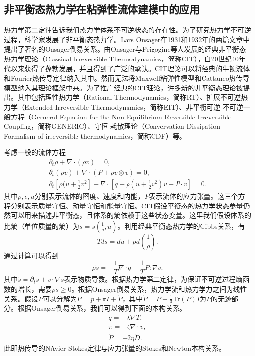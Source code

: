\subsection{非平衡态热力学在粘弹性流体建模中的应用}
热力学第二定律告诉我们热力学体系不可逆状态的存在性。为了研究热力学不可逆过程，科学家发展了非平衡态热力学。Lars Onsager在1931和1932年的两篇文章中提出了著名的Onsager倒易关系\cite{onsager1931reciprocal,onsager1931reciprocalII}。由Onsager与Prigogine等人发展的经典非平衡态热力学理论（Classical Irreversible Thermodynamics，简称CIT），自20世纪40年代以来获得了蓬勃发展，并且得到了广泛的承认\cite{jou1996extended,truesdell2012rational}。CIT理论可以将经典的牛顿流体和Fourier热传导定律纳入其中。然而无法将Maxwell粘弹性模型和Cattaneo热传导模型纳入其理论框架中来。为了推广经典的CIT理论，许多新的非平衡态理论被提出。其中包括理性热力学（Rational Thermodynamics，简称RT）、扩展不可逆热力学（Extended Irreversible Thermodynamics，简称EIT）、非平衡可逆-不可逆一般方程（Gerneral Equation for the Non-Equilibrium Reversible-Irreversible Coupling，简称GENERIC）、守恒-耗散理论（Convervation-Dissipation Formalism of irreversible thermodynamics，简称CDF）等\cite{truesdell2012rational,jou1996extended,ottinger2005beyond,zhu2014conservation}。

考虑一般的流体方程
\begin{subequations} \label{eq:fluid}
	\begin{align}
		\partial_t \rho + \nabla \cdot (\rho v) = 0 ,\\
		\partial_t (\rho v) + \nabla \cdot (P + \rho v \otimes v) =  0, \\
		\partial_t[\rho (u + \frac{1}{2} v^2] + \nabla \cdot [q + \rho (u+\frac{1}{2}v^2) v + P \cdot v] = 0.
	\end{align}
\end{subequations}
其中$\rho,v,u$分别表示流体的密度、速度和内能，$P$表示流体的应力张量。这三个方程分别表示质量守恒、动量守恒和能量守恒。CIT假设平衡态的热力学状态参量仍然可以用来描述非平衡态，且体系的熵依赖于这些状态变量。这里我们假设体系的比熵（单位质量的熵）为$s=s(\frac{1}{\rho},u)$。利用经典平衡态热力学的Gibbs关系，有
\begin{equation*}
	T ds = du + p d(\frac{1}{\rho}).
\end{equation*}
通过计算可以得到
\begin{equation*}
	\rho \dot{s} = - \frac{1}{T} \nabla \cdot q - \frac{1}{T} P: \nabla v.
\end{equation*}
其中$\dot{s} = \partial_t s + v \cdot \nabla s$表示物质导数。根据热力学第二定律，为保证不可逆过程熵函数的增长，需要$\rho \dot{s} \ge 0 $。根据Onsager倒易关系，热力学流和热力学力之间为线性关系。假设$P$可以分解为$P = p + \pi I + \mathring{P}$，其中$\mathring{P} = P - \frac{1}{3} \mbox{Tr}(P) I$为$P$的无迹部分。根据Onsager倒易关系，我们可以得到下面的本构关系。
\begin{eqnarray*}
	q = -\lambda \nabla T, \\
	\pi =  - \zeta \nabla \cdot v, \\
	\mathring{P} = - 2 \eta \mathring{D}.
\end{eqnarray*}
此即热传导的NAvier-Stokes定律与应力张量的Stokes和Newton本构关系。

